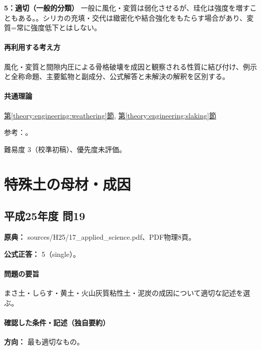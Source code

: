 \noindent\textbf{5：適切（一般的分類）} 一般に風化・変質は弱化させるが、珪化は強度を増すこともある。。シリカの充填・交代は緻密化や結合強化をもたらす場合があり、変質=常に強度低下とはしない。\par

\paragraph{再利用する考え方} 風化・変質と間隙内圧による骨格破壊を成因と観察される性質に結び付け、例示と全称命題、主要鉱物と副成分、公式解答と未解決の解釈を区別する。

\paragraph{共通理論} \hyperref[theory:engineering:weathering]{第\ref*{theory:engineering:weathering}節}, \hyperref[theory:engineering:slaking]{第\ref*{theory:engineering:slaking}節}

\par 参考：\cite{slaking1979,slaking2006,jseg_engineering_faq}。

\par 難易度 3（校準初稿）、優先度未評価。

\section{特殊土の母材・成因}

\subsection{平成25年度 問19}
\label{q:h25-reg-applied-19}

\noindent\textbf{原典：} sources/H25/17\_applied\_science.pdf、PDF物理8頁。

\textbf{公式正答：} 5（single）。

\paragraph{問題の要旨} まさ土・しらす・黄土・火山灰質粘性土・泥炭の成因について適切な記述を選ぶ。

\paragraph{確認した条件・記述（独自要約）}\mbox{}\par

\noindent\textbf{方向：} 最も適切なもの。\par

